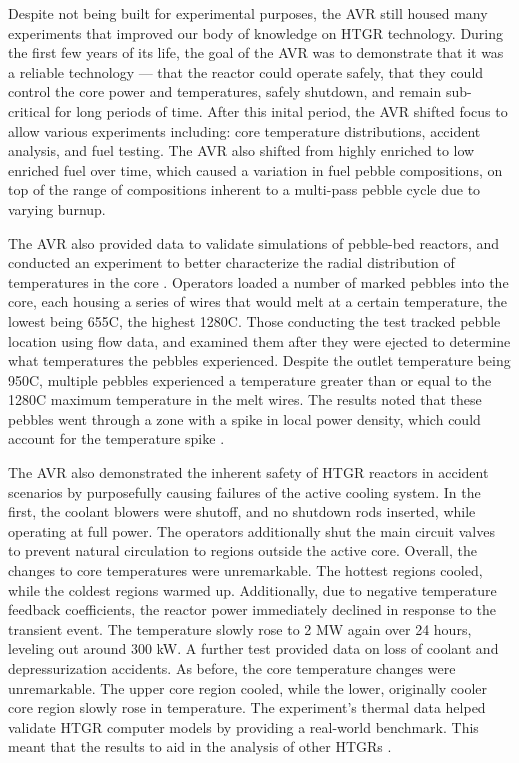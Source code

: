 Despite not being built for experimental purposes, the AVR still housed many experiments that improved our body of knowledge on HTGR technology.  During the first few years of its life, the goal of the AVR was to demonstrate that it was a reliable technology --- that the reactor could operate safely, that they could control the core power and temperatures, safely shutdown, and remain sub-critical for long periods of time.  After this inital period, the AVR shifted focus to allow various experiments including: core temperature distributions, accident analysis, and fuel testing.  The AVR also shifted from highly enriched to low enriched fuel over time, which caused a variation in fuel pebble compositions, on top of the range of compositions inherent to a multi-pass pebble cycle due to varying burnup.

The AVR also provided data to validate simulations of pebble-bed reactors, and conducted an experiment to better characterize the radial distribution of temperatures in the core \cite{noauthor_results_1990}.  Operators loaded a number of marked pebbles into the core, each housing a series of wires that would melt at a certain temperature, the lowest being 655\textdegree  C, the highest 1280\textdegree  C.  Those conducting the test tracked pebble location using flow data, and examined them after they were ejected to determine what temperatures the pebbles experienced.  Despite the outlet temperature being 950\textdegree  C, multiple pebbles experienced a temperature greater than or equal to the 1280\textdegree C maximum temperature in the melt wires.  The results noted that these pebbles went through a zone with a spike in local power density, which could account for the temperature spike \cite{noauthor_results_1990}.

The AVR also demonstrated the inherent safety of HTGR reactors in accident scenarios by purposefully causing failures of the active cooling system.  In the first, the coolant blowers were shutoff, and no shutdown rods inserted, while operating at full power.  The operators additionally shut the main circuit valves to prevent natural circulation to regions outside the active core.  Overall, the changes to core temperatures were unremarkable.  The hottest regions cooled, while the coldest regions warmed up.  Additionally, due to negative temperature feedback coefficients, the reactor power immediately declined in response to the transient event.  The temperature slowly rose to 2 MW again over 24 hours, leveling out around 300 kW.  A further test provided data on loss of coolant and depressurization accidents.  As before, the core temperature changes were unremarkable.  The upper core region cooled, while the lower, originally cooler core region slowly rose in temperature.  The experiment's thermal data helped validate HTGR computer models by providing a real-world benchmark.  This meant that the results to aid in the analysis of other HTGRs \cite{noauthor_results_1990}.

